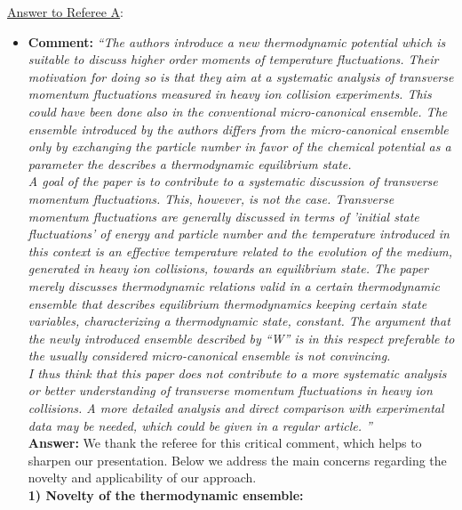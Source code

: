 \documentclass[aps,article,author-year,notitlepage,showpacs]{revtex4-2}
\begin{document}
\noindent \underline{Answer to Referee A}:\\

\begin{itemize}

\item[$\bullet$] {\bf Comment:}  {\it ``The authors introduce a new thermodynamic potential which is suitable
to discuss higher order moments of temperature fluctuations. Their
motivation for doing so is that they aim at a systematic analysis of
transverse momentum fluctuations measured in heavy ion collision
experiments. This could have been done also in the conventional
micro-canonical ensemble. The ensemble introduced by the authors
differs from the micro-canonical ensemble only by exchanging the
particle number in favor of the chemical potential as a parameter the
describes a thermodynamic equilibrium state.\\[-2ex]

A goal of the paper is to contribute to a systematic discussion of
transverse momentum fluctuations. This, however, is not the case.
Transverse momentum fluctuations are generally discussed in terms of
'initial state fluctuations' of energy and particle number and the
temperature introduced in this context is an effective temperature
related to the evolution of the medium, generated in heavy ion
collisions, towards an equilibrium state. The paper merely discusses
thermodynamic relations valid in a certain thermodynamic ensemble that
describes equilibrium thermodynamics keeping certain state variables,
characterizing a thermodynamic state, constant. The argument that the
newly introduced ensemble described by ``W'' is in this respect
preferable to the usually considered micro-canonical ensemble is not
convincing.\\[-2ex]

I thus think that this paper does not contribute to a more systematic
analysis or better understanding of transverse momentum fluctuations
in heavy ion collisions. A more detailed analysis and direct
comparison with experimental data may be needed, which could be given
in a regular article.
''}\\[-1ex]

{\bf Answer:} We thank the referee for this critical comment, which helps to sharpen our presentation. Below we address the main concerns regarding the novelty and applicability of our approach. \\[-2ex]

{\bf 1) Novelty of the thermodynamic ensemble:}\\[-2ex]


\end{itemize}
\end{document}
